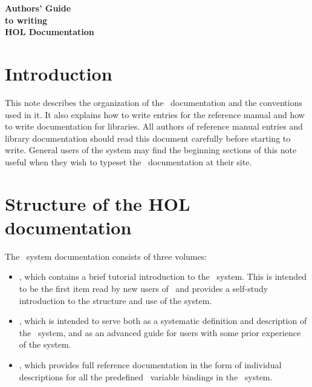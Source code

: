 \documentclass[12pt]{article}
\begin{document}
   \setlength{\unitlength}{1mm}           %
   \setlength{\baselineskip}{16pt}        %
   \pagestyle{plain}                      %


\vskip20mm

\begin{center}
\LARGE \bf Authors' Guide\\
to writing\\
HOL Documentation
\end{center}

\vskip20mm

\section*{Introduction}

This note describes the organization of the \HOL\ documentation and the
conventions used in it.  It also explains how to write entries for the
reference manual and how to write documentation for libraries.  All authors of
reference manual entries and library documentation should read this document
carefully before starting to write.  General users of the system may find the
beginning sections of this note useful when they wish to typeset the \HOL\
documentation at their site.

\section{Structure of the HOL documentation}

The \HOL\ system documentation consists of three volumes:

\begin{itemize}

\item \TUTORIAL, which contains a brief tutorial introduction to the \HOL\
system. This is intended to be the first item read by new users of \HOL\ and
provides a self-study introduction to the structure and use of the system.

\item \DESCRIPTION, which is intended to serve both as a systematic definition
and description of the \HOL\ system, and as an advanced guide for users with
some prior experience of the system.

\item \REFERENCE, which provides full reference documentation in the form of
individual descriptions for all the predefined \ML\ variable bindings in the
\HOL\ system.

\end{itemize}
\end{document}
